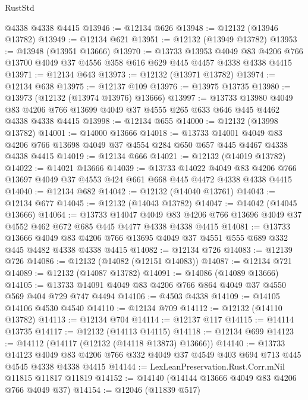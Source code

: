 \begin{lexlean}{RustStd}
\begin{coremodule}
{\begin{coremodule}
{{{{{{{{{{{{{{{{{{{{{{{{{{{{{{{{{{{{{{{{{{{{{{{{{{    @4338
    @4338
    @4415
@13946 := @12134 @626
@13948 := @12132 (@13946 @13782)
@13949 := @12134 @621
@13951 := @12132 (@13949 @13782)
@13953 := @13948 (@13951 @13666)
@13970 := @13733
    @13953
    @4049
    @83
    @4206
    @766
    @13700
    @4049
    @37
    @4556
    @358
    @616
    @629
    @445
    @4457
    @4338
    @4338
    @4415
@13971 := @12134 @643
@13973 := @12132 (@13971 @13782)
@13974 := @12134 @638
@13975 := @12137 @109
@13976 := @13975 @13735
@13980 := @13973 (@12132 (@13974 @13976) @13666)
@13997 := @13733
    @13980
    @4049
    @83
    @4206
    @766
    @13699
    @4049
    @37
    @4555
    @265
    @633
    @646
    @445
    @4462
    @4338
    @4338
    @4415
@13998 := @12134 @655
@14000 := @12132 (@13998 @13782)
@14001 := @14000 @13666
@14018 := @13733
    @14001
    @4049
    @83
    @4206
    @766
    @13698
    @4049
    @37
    @4554
    @284
    @650
    @657
    @445
    @4467
    @4338
    @4338
    @4415
@14019 := @12134 @666
@14021 := @12132 (@14019 @13782)
@14022 := @14021 @13666
@14039 := @13733
    @14022
    @4049
    @83
    @4206
    @766
    @13697
    @4049
    @37
    @4553
    @424
    @661
    @668
    @445
    @4472
    @4338
    @4338
    @4415
@14040 := @12134 @682
@14042 := @12132 (@14040 @13761)
@14043 := @12134 @677
@14045 := @12132 (@14043 @13782)
@14047 := @14042 (@14045 @13666)
@14064 := @13733
    @14047
    @4049
    @83
    @4206
    @766
    @13696
    @4049
    @37
    @4552
    @462
    @672
    @685
    @445
    @4477
    @4338
    @4338
    @4415
@14081 := @13733
    @13666
    @4049
    @83
    @4206
    @766
    @13695
    @4049
    @37
    @4551
    @555
    @689
    @332
    @445
    @4482
    @4338
    @4338
    @4415
@14082 := @12134 @726
@14083 := @12139 @726
@14086 := @12132 (@14082 (@12151 @14083))
@14087 := @12134 @721
@14089 := @12132 (@14087 @13782)
@14091 := @14086 (@14089 @13666)
@14105 := @13733 @14091 @4049 @83 @4206 @766 @864 @4049 @37 @4550 @569 @404 @729 @747 @4494
@14106 := @4503 @4338
@14109 := @14105 @14106 @4530 @4540
@14110 := @12134 @709
@14112 := @12132 (@14110 @13782)
@14113 := @12134 @704
@14114 := @12137 @117
@14115 := @14114 @13735
@14117 := @12132 (@14113 @14115)
@14118 := @12134 @699
@14123 := @14112 (@14117 (@12132 (@14118 @13873) @13666))
@14140 := @13733
    @14123
    @4049
    @83
    @4206
    @766
    @332
    @4049
    @37
    @4549
    @403
    @694
    @713
    @445
    @4545
    @4338
    @4338
    @4415
@14144 := LexLeanPreservation.Rust.Corr.mNil @11815 @11817 @11819
@14152 := @14140 (@14144 @13666 @4049 @83 @4206 @766 @4049 @37)
@14154 := @12046 (@11839 @517)
}}}}}}}}}}}}}}}}}}}}}}}}}}}}}}}}}}}}}}}}}}}}}}}}}}
\end{coremodule}}
\end{coremodule}
\end{lexlean}
